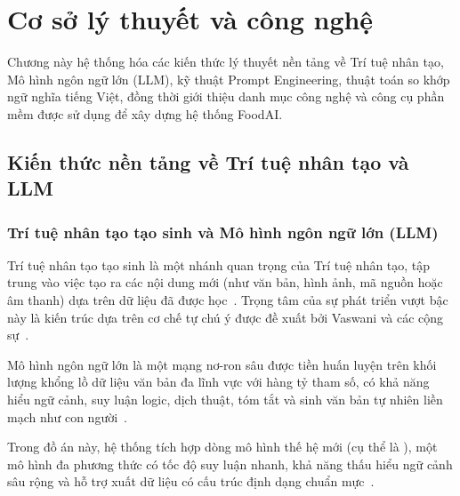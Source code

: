 \chapter{Cơ sở lý thuyết và công nghệ}
\label{ch:coso}

\begin{muctieu}
Chương này hệ thống hóa các kiến thức lý thuyết nền tảng về Trí tuệ nhân tạo, Mô hình ngôn ngữ lớn (LLM), kỹ thuật Prompt Engineering, thuật toán so khớp ngữ nghĩa tiếng Việt, đồng thời giới thiệu danh mục công nghệ và công cụ phần mềm được sử dụng để xây dựng hệ thống FoodAI.
\end{muctieu}

\section{Kiến thức nền tảng về Trí tuệ nhân tạo và LLM}

\subsection{Trí tuệ nhân tạo tạo sinh và Mô hình ngôn ngữ lớn (LLM)}

Trí tuệ nhân tạo tạo sinh  là một nhánh quan trọng của Trí tuệ nhân tạo, tập trung vào việc tạo ra các nội dung mới (như văn bản, hình ảnh, mã nguồn hoặc âm thanh) dựa trên dữ liệu đã được học~\cite{RussellNorvig2021, HoangKiem}. Trọng tâm của sự phát triển vượt bậc này là kiến trúc  dựa trên cơ chế tự chú ý  được đề xuất bởi Vaswani và các cộng sự~\cite{Vaswani2017}.

\begin{dinhnghia}
Mô hình ngôn ngữ lớn  là một mạng nơ-ron sâu được tiền huấn luyện trên khối lượng khổng lồ dữ liệu văn bản đa lĩnh vực với hàng tỷ tham số, có khả năng hiểu ngữ cảnh, suy luận logic, dịch thuật, tóm tắt và sinh văn bản tự nhiên liền mạch như con người~\cite{Brown2020}.
\end{dinhnghia}

Trong đồ án này, hệ thống tích hợp dòng mô hình  thế hệ mới (cụ thể là ), một mô hình đa phương thức  có tốc độ suy luận nhanh, khả năng thấu hiểu ngữ cảnh sâu rộng và hỗ trợ xuất dữ liệu có cấu trúc định dạng chuẩn mực~\cite{Gemini2023, GoogleGenAISDK}.

